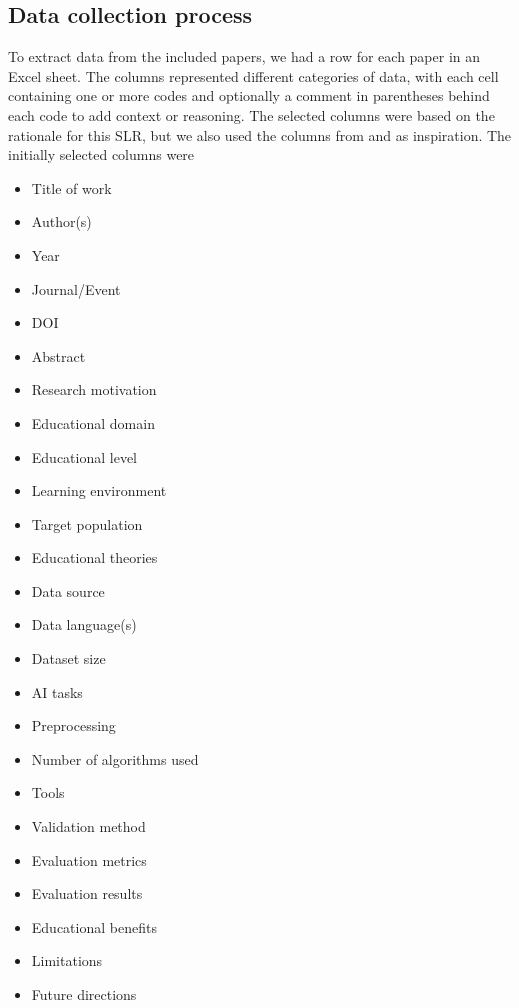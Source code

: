 \subsection{Data collection process}
To extract data from the included papers, we had a row for each paper in an Excel sheet. The columns represented different categories of data, with each cell containing one or more codes and optionally a comment in parentheses behind each code to add context or reasoning. The selected columns were based on the rationale for this SLR, but we also used the columns from \cite{autoassessmentlitrev} and \cite{textmininglitrev} as inspiration. The initially selected columns were

\begin{itemize}
    \item Title of work
    \item Author(s)
    \item Year
    \item Journal/Event
    \item DOI
    \item Abstract
    \item Research motivation
    \item Educational domain
    \item Educational level
    \item Learning environment
    \item Target population
    \item Educational theories
    \item Data source
    \item Data language(s)
    \item Dataset size
    \item AI tasks
    \item Preprocessing
    \item Number of algorithms used
    \item Tools
    \item Validation method
    \item Evaluation metrics
    \item Evaluation results
    \item Educational benefits
    \item Limitations
    \item Future directions
\end{itemize}


